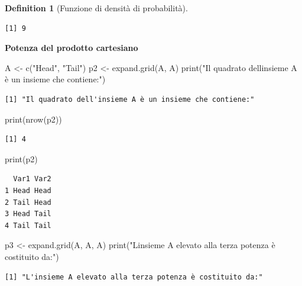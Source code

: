 \documentclass[
  letterpaper,
  DIV=11,
  numbers=noendperiod,
  oneside]{scrreprt}
\newenvironment{Shaded}{\begin{snugshade}}{\end{snugshade}}
\newcommand{\FunctionTok}[1]{\textcolor[rgb]{0.28,0.35,0.67}{#1}}
\newcommand{\NormalTok}[1]{\textcolor[rgb]{0.00,0.23,0.31}{#1}}
\newcommand{\OtherTok}[1]{\textcolor[rgb]{0.00,0.23,0.31}{#1}}
\newcommand{\StringTok}[1]{\textcolor[rgb]{0.13,0.47,0.30}{#1}}
\theoremstyle{definition}
\theoremstyle{plain}
\theoremstyle{definition}
\newtheorem{definition}{Definition}[chapter]
\theoremstyle{remark}
\begin{document}
\begin{definition}[Funzione di densità di
probabilità]
\begin{verbatim}
[1] 9
\end{verbatim}

\textbf{Potenza del prodotto cartesiano}

\begin{Shaded}
\begin{Highlighting}[]
\NormalTok{A }\OtherTok{\textless{}{-}} \FunctionTok{c}\NormalTok{(}\StringTok{"Head"}\NormalTok{, }\StringTok{"Tail"}\NormalTok{)}
\NormalTok{p2 }\OtherTok{\textless{}{-}} \FunctionTok{expand.grid}\NormalTok{(A, A)}
\FunctionTok{print}\NormalTok{(}\StringTok{"Il quadrato dell\textquotesingle{}insieme A è un insieme che contiene:"}\NormalTok{)}
\end{Highlighting}
\end{Shaded}

\begin{verbatim}
[1] "Il quadrato dell'insieme A è un insieme che contiene:"
\end{verbatim}

\begin{Shaded}
\begin{Highlighting}[]
\FunctionTok{print}\NormalTok{(}\FunctionTok{nrow}\NormalTok{(p2))}
\end{Highlighting}
\end{Shaded}

\begin{verbatim}
[1] 4
\end{verbatim}

\begin{Shaded}
\begin{Highlighting}[]
\FunctionTok{print}\NormalTok{(p2)}
\end{Highlighting}
\end{Shaded}

\begin{verbatim}
  Var1 Var2
1 Head Head
2 Tail Head
3 Head Tail
4 Tail Tail
\end{verbatim}

\begin{Shaded}
\begin{Highlighting}[]
\NormalTok{p3 }\OtherTok{\textless{}{-}} \FunctionTok{expand.grid}\NormalTok{(A, A, A)}
\FunctionTok{print}\NormalTok{(}\StringTok{"L\textquotesingle{}insieme A elevato alla terza potenza è costituito da:"}\NormalTok{)}
\end{Highlighting}
\end{Shaded}

\begin{verbatim}
[1] "L'insieme A elevato alla terza potenza è costituito da:"
\end{verbatim}


\end{definition}
\end{document}
